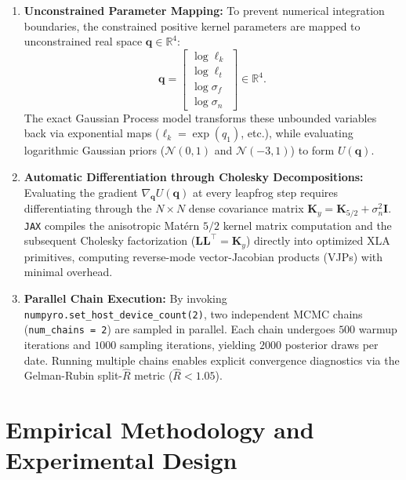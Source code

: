 \documentclass[12pt,oneside]{report}
\theoremstyle{definition}
\theoremstyle{remark}
\begin{document}
\begin{enumerate}
    \item \textbf{Unconstrained Parameter Mapping:} To prevent numerical integration boundaries, the constrained positive kernel parameters are mapped to unconstrained real space $\mathbf{q} \in \mathbb{R}^4$:
    \begin{equation}
        \mathbf{q} = \begin{bmatrix} 
        \log \ell_k \\ 
        \log \ell_t \\ 
        \log \sigma_f \\ 
        \log \sigma_n 
        \end{bmatrix} \in \mathbb{R}^4.
    \end{equation}
    The exact Gaussian Process model transforms these unbounded variables back via exponential maps ($\ell_k = \exp(q_1)$, etc.), while evaluating logarithmic Gaussian priors ($\mathcal{N}(0, 1)$ and $\mathcal{N}(-3, 1)$) to form $U(\mathbf{q})$.
    
    \item \textbf{Automatic Differentiation through Cholesky Decompositions:} Evaluating the gradient $\nabla_{\mathbf{q}} U(\mathbf{q})$ at every leapfrog step requires differentiating through the $N \times N$ dense covariance matrix $\mathbf{K}_y = \mathbf{K}_{5/2} + \sigma_n^2 \mathbf{I}$. \texttt{JAX} compiles the anisotropic Matérn $5/2$ kernel matrix computation and the subsequent Cholesky factorization ($\mathbf{L}\mathbf{L}^\top = \mathbf{K}_y$) directly into optimized XLA primitives, computing reverse-mode vector-Jacobian products (VJPs) with minimal overhead.
    
    \item \textbf{Parallel Chain Execution:} By invoking \texttt{numpyro.set\_host\_device\_count(2)}, two independent MCMC chains (\texttt{num\_chains = 2}) are sampled in parallel. Each chain undergoes $500$ warmup iterations and $1000$ sampling iterations, yielding $2000$ posterior draws per date. Running multiple chains enables explicit convergence diagnostics via the Gelman-Rubin split-$\hat{R}$ metric ($\hat{R} < 1.05$).
\end{enumerate}


\chapter{Empirical Methodology and Experimental Design}
\end{document}
